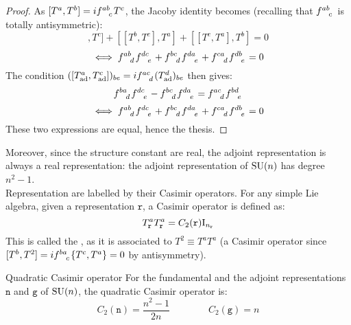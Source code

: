 \begin{proofbox}
  \begin{proof}
    As $ [T^a,T^b] = i \tensor{f}{^a^b_c} T^c $, the Jacoby identity becomes (recalling that $ \tensor{f}{^a^b_c} $ is totally antisymmetric):
    \begin{equation*}
      [[T^a,T^b],T^c] + [[T^b,T^c],T^a] + [[T^c,T^a],T^b] = 0
    \end{equation*}
    \begin{equation*}
      \iff \tensor{f}{^a^b_d} \tensor{f}{^d^c_e} + \tensor{f}{^b^c_d} \tensor{f}{^d^a_e} + \tensor{f}{^c^a_d} \tensor{f}{^d^b_e} = 0
    \end{equation*}
    The condition $ ([T^a_\text{ad},T^c_\text{ad}])_{be} = i \tensor{f}{^a^c_d} (T^d_\text{ad})_{be} $ then gives:
    \begin{equation*}
      \tensor{f}{^b^a_d} \tensor{f}{^d^c_e} - \tensor{f}{^b^c_d} \tensor{f}{^d^a_e} = \tensor{f}{^a^c_d} \tensor{f}{^b^d_e}
    \end{equation*}
    \begin{equation*}
      \iff \tensor{f}{^a^b_d} \tensor{f}{^d^c_e} + \tensor{f}{^b^c_d} \tensor{f}{^d^a_e} + \tensor{f}{^c^a_d} \tensor{f}{^d^b_e} = 0
    \end{equation*}
    These two expressions are equal, hence the thesis.
  \end{proof}
\end{proofbox}

Moreover, since the structure constant are real, the adjoint representation is always a real representation: the adjoint representation of $ \mathrm{SU}(n) $ has degree $ n^2 - 1 $.\\
Representation are labelled by their Casimir operators. For any simple Lie algebra, given a representation $ \mathtt{r} $, a Casimir operator is defined as:
\begin{equation}
  T^a_\mathtt{r} T^a_\mathtt{r} = C_2(\mathtt{r}) \mathrm{I}_{n_{\mathtt{r}}}
  \label{eq:quad-cas}
\end{equation}
This is called the , as it is associated to $ T^2 \equiv T^a T^a $ (a Casimir operator since $ [T^b, T^2] = i \tensor{f}{^b^a_c} \{T^c,T^a\} = 0 $ by antisymmetry).

\begin{proposition}{Quadratic Casimir operator}{}
  For the fundamental and the adjoint representations $ \mathtt{n} $ and $ \mathtt{g} $ of $ \mathrm{SU}(n) $, the quadratic Casimir operator is:
  \begin{equation}
    C_2(\mathtt{n}) = \frac{n^2 - 1}{2n}
    \qquad \qquad
    C_2(\mathtt{g}) = n
  \end{equation}
\end{proposition}


